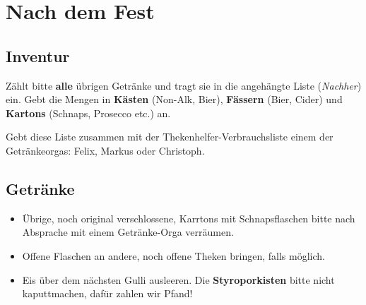 \section{Nach dem Fest}
\subsection{Inventur}
Zählt bitte \textbf{alle} übrigen Getränke und tragt sie in die angehängte Liste (\emph{Nachher}) ein. Gebt die Mengen in \textbf{Kästen} (Non-Alk, Bier), \textbf{Fässern} (Bier, Cider) und \textbf{Kartons} (Schnaps, Prosecco etc.) an.

Gebt diese Liste zusammen mit der Thekenhelfer-Verbrauchsliste einem der Getränkeorgas: Felix, Markus oder Christoph.
\subsection{Getränke}
\begin{itemize}
  \item Übrige, noch original verschlossene, Karrtons mit Schnapsflaschen bitte nach Absprache mit einem Getränke-Orga verräumen.
  \item Offene Flaschen an andere, noch offene Theken bringen, falls möglich.
  \item Eis über dem nächsten Gulli ausleeren. Die \textbf{Styroporkisten} bitte nicht kaputtmachen, dafür zahlen wir Pfand!
\end{itemize}
